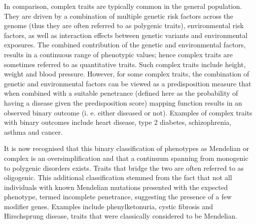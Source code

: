 In comparison, complex traits are typically common in the general population. They are driven by a combination of multiple genetic risk factors across the genome (thus they are often referred to as polygenic traits), environmental risk factors, as well as interaction effects between genetic variants and environmental exposures. The combined contribution of the genetic and environmental factors, results in a continuous range of phenotypic values; hence complex traits are sometimes referred to as quantitative traits. Such complex traits include height, weight and blood pressure. However, for some complex traits, the combination of genetic and environmental factors can be viewed as a predisposition measure that when combined with a suitable penetrance (defined here as the probability of having a disease given the predisposition score) mapping function results in an observed binary outcome (i. e. either diseased or not). Examples of complex traits with binary outcomes include heart disease, type 2 diabetes, schizophrenia, asthma and cancer. 

It is now recognised that this binary classification of phenotypes as Mendelian or complex is an oversimplification and that a continuum spanning from monogenic to polygenic disorders exists. Traits that bridge the two are often referred to as oligogenic. This additional classification stemmed from the fact that not all individuals with known Mendelian mutations presented with the expected phenotype, termed incomplete penetrance, suggesting the presence of a few modifier genes. Examples include phenylketonuria, cystic fibrosis and Hirschsprung disease, traits that were classically considered to be Mendelian.
